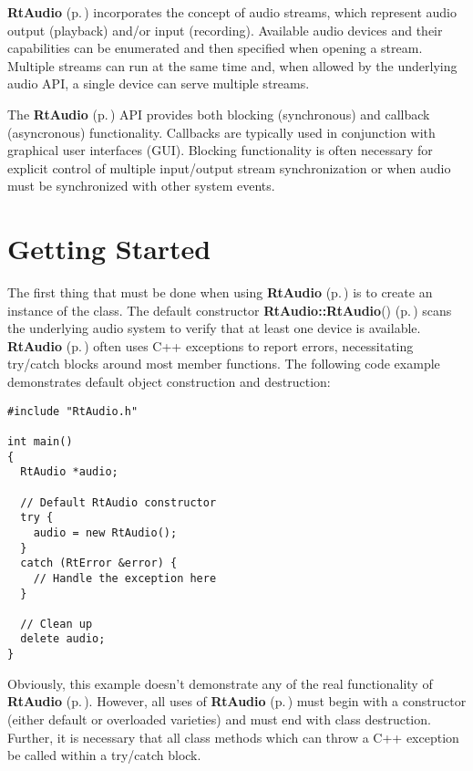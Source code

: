 {\bf Rt\-Audio} {\rm (p.\,\pageref{classRtAudio})} incorporates the concept of audio streams, which represent audio output (playback) and/or input (recording). Available audio devices and their capabilities can be enumerated and then specified when opening a stream. Multiple streams can run at the same time and, when allowed by the underlying audio API, a single device can serve multiple streams.

The {\bf Rt\-Audio} {\rm (p.\,\pageref{classRtAudio})} API provides both blocking (synchronous) and callback (asyncronous) functionality. Callbacks are typically used in conjunction with graphical user interfaces (GUI). Blocking functionality is often necessary for explicit control of multiple input/output stream synchronization or when audio must be synchronized with other system events.

\section{Getting Started}\label{start}


The first thing that must be done when using {\bf Rt\-Audio} {\rm (p.\,\pageref{classRtAudio})} is to create an instance of the class. The default constructor {\bf Rt\-Audio::Rt\-Audio}() {\rm (p.\,\pageref{classRtAudio_a0})} scans the underlying audio system to verify that at least one device is available. {\bf Rt\-Audio} {\rm (p.\,\pageref{classRtAudio})} often uses C++ exceptions to report errors, necessitating try/catch blocks around most member functions. The following code example demonstrates default object construction and destruction:

\footnotesize\begin{verbatim}#include "RtAudio.h"

int main()
{
  RtAudio *audio;

  // Default RtAudio constructor
  try {
    audio = new RtAudio();
  }
  catch (RtError &error) {
    // Handle the exception here
  }

  // Clean up
  delete audio;
}\end{verbatim}\normalsize 


Obviously, this example doesn't demonstrate any of the real functionality of {\bf Rt\-Audio} {\rm (p.\,\pageref{classRtAudio})}. However, all uses of {\bf Rt\-Audio} {\rm (p.\,\pageref{classRtAudio})} must begin with a constructor (either default or overloaded varieties) and must end with class destruction. Further, it is necessary that all class methods which can throw a C++ exception be called within a try/catch block.

